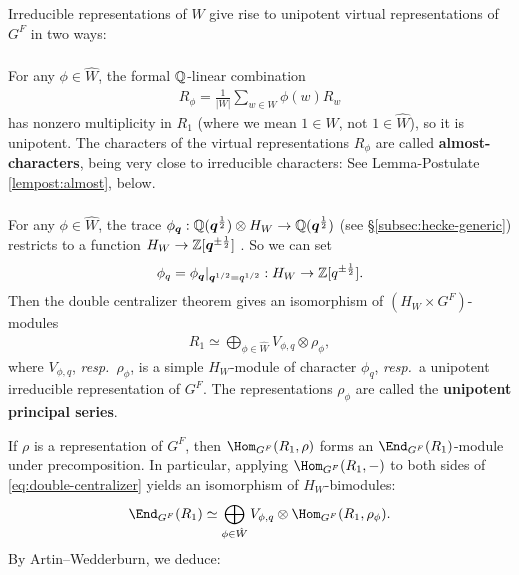 \documentclass[a4paper,10pt,leqno]{amsart}
\theoremstyle{plain}
\theoremstyle{plain}
\theoremstyle{plain}
\theoremstyle{definition}
\theoremstyle{remark}
\newcommand{\dfemph}[1]{\textbf{#1}}
\newcommand{\Q}{\bm{q}}
\begin{document}
Irreducible representations of $W$ give rise to unipotent virtual representations of $G^F$ in two ways:

\subsubsection{}
For any $\phi \in \hat{W}$, the formal $\mathbb{Q}$-linear combination
\begin{align}\label{eq:almost}
R_\phi = \frac{1}{|W|} \sum_{w \in W} \phi(w)R_w
\end{align}
has nonzero multiplicity in $R_1$ (where we mean $1 \in W$, not $1 \in \hat{W}$), so it is unipotent.
The characters of the virtual representations $R_\phi$ are called \dfemph{almost-characters}, being very close to irreducible characters: 
See Lemma-Postulate \ref{lempost:almost}, below.

\subsubsection{}

For any $\phi \in \hat{W}$, the trace $\phi_{\Q} : \bb{Q}(\Q^{\frac{1}{2}}) \otimes H_W \to \bb{Q}(\Q^{\frac{1}{2}})$ (see \S\ref{subsec:hecke-generic}) restricts to a function $H_W \to  \bb{Z}[\Q^{\pm\frac{1}{2}}]$ \cite[Thm.\ 9.3.5]{gp}.
So we can set
\begin{align}
\phi_q = \phi_{\Q}|_{\Q^{1/2} = q^{1/2}} : H_W \to \bb{Z}[q^{\pm\frac{1}{2}}].
\end{align}
Then the double centralizer theorem gives an isomorphism of $(H_W \times G^F)$-modules
\begin{align}\label{eq:double-centralizer}
R_1 \simeq \bigoplus_{\phi \in \hat{W}}
V_{\phi, q} \otimes \rho_\phi,
\end{align}
where $V_{\phi, q}$, \emph{resp.}\ $\rho_\phi$, is a simple $H_W$-module of character $\phi_q$, \emph{resp.}\ a unipotent irreducible representation of $G^F$.
The representations $\rho_\phi$ are called the \dfemph{unipotent principal series}.

If $\rho$ is a representation of $G^F$, then $\Hom_{G^F}(R_1, \rho)$ forms an $\End_{G^F}(R_1)$-module under precomposition.
In particular, applying $\Hom_{G^F}(R_1, -)$ to both sides of \eqref{eq:double-centralizer} yields an isomorphism of $H_W$-bimodules:
\begin{align}
\End_{G^F}(R_1) \simeq \bigoplus_{\phi \in \hat{W}}
V_{\phi, q} \otimes \Hom_{G^F}(R_1, \rho_\phi).
\end{align}
By Artin--Wedderburn, we deduce:
\end{document}
